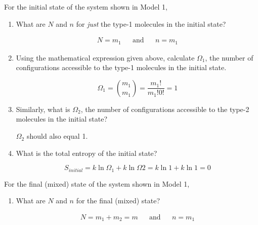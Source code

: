 \begin{activity}
\begin{ctqs}
		\question For the initial state of the system shown in Model 1,
			\begin{enumerate}
				\item What are $N$ and $n$ for \emph{just} the type-1 molecules in the initial state?
				
					\begin{solution}[0.75in]
						\begin{align*}
							N = m_1 && \text{and} && n = m_1
						\end{align*}
					\end{solution}
					
				\item Using the mathematical expression given above, calculate $\Omega_1$, the number of configurations accessible to the type-1 molecules in the initial state.
				
					\begin{solution}[1.5in]
						\begin{equation*}
							\Omega_1 = {m_1 \choose m_1} = \frac{m_1!}{m_1! 0!} = 1
						\end{equation*}
					\end{solution}
				
				\item Similarly, what is $\Omega_2$, the number of configurations accessible to the type-2 molecules in the initial state?
				
					\begin{solution}[1in]
						$\Omega_2$ should also equal 1.
					\end{solution}
					
				\item What is the total entropy of the initial state?
					
					\begin{solution}[1in]
						\begin{equation*}
						S_{initial} = k \ln \Omega_1 + k \ln \Omega 2 = k \ln 1 + k \ln 1 = 0
						\end{equation*}
					\end{solution}
			\end{enumerate}
		
		\question For the final (mixed) state of the system shown in Model 1, 
			\begin{enumerate}
				\item What are $N$ and $n$ for the final (mixed) state?
				
					\begin{solution}[0.75in]
						\begin{align*}
							N = m_1+m_2=m && \text{and} && n = m_1
						\end{align*}
					\end{solution}
					

\end{enumerate}
\end{ctqs}
\end{activity}
